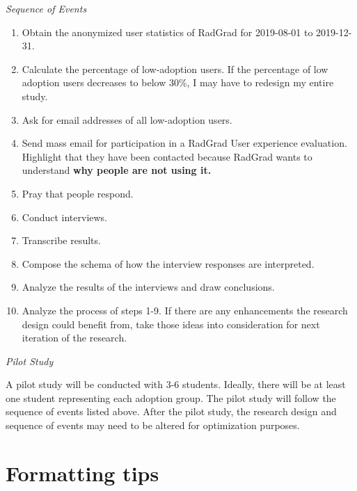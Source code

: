 \documentclass[english]{proposalnsf}
\begin{document}
{\em Sequence of Events}

\begin{enumerate}
	\item Obtain the anonymized user statistics of RadGrad for 2019-08-01 to 2019-12-31.
	\item Calculate the percentage of low-adoption users. If the percentage of low adoption users decreases to below 30{\%}, I may have to redesign my entire study. 
	\item Ask for email addresses of all low-adoption users.
	\item Send mass email for participation in a RadGrad User experience evaluation. Highlight that they have been contacted because RadGrad wants to understand \textbf{why people are not using it.}
	\item Pray that people respond.
	\item Conduct interviews.
	\item Transcribe results.
	\item Compose the schema of how the interview responses are interpreted.
	\item Analyze the results of the interviews and draw conclusions.
	\item Analyze the process of steps 1-9. If there are any enhancements the research design could benefit from, take those ideas into consideration for next iteration of the research.
\end{enumerate}

{\em Pilot Study}

A pilot study will be conducted with 3-6 students. Ideally, there will be at least one student representing each adoption group. The pilot study will follow the sequence of events listed above. After the pilot study, the research design and sequence of events may need to be altered for optimization purposes.  




\appendix
\section{Formatting tips}
\end{document}

